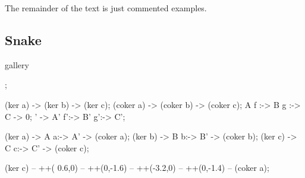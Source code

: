 
The remainder of the text is just commented examples.

\clearpage

\subsection{Snake}

\begin{tcblisting}{gallery}
\begin{kodi}[golden]
  ;

  \mor   (ker a) ->   (ker b) ->   (ker c);
  \mor (coker a) -> (coker b) -> (coker c);
  \mor       A  f :-> B  g :-> C -> 0;
  ' -> A' f':-> B' g':-> C';

   (ker a) -> A a:-> A' -> (coker a);
   (ker b) -> B b:-> B' -> (coker b);
   (ker c) -> C c:-> C' -> (coker c);

  \draw[/kD/arrows/crossing over, ->, rounded corners, >=stealth]
    (ker c) -- ++( 0.6,0) -- ++(0,-1.6)
            -- ++(-3.2,0) -- ++(0,-1.4) -- (coker a);
\end{kodi}
\end{tcblisting}

\clearpage





